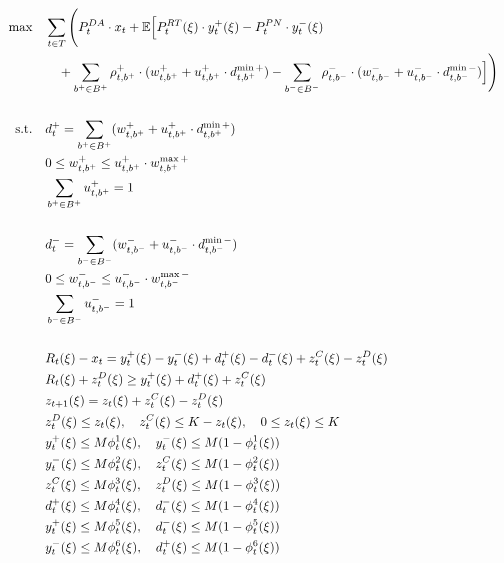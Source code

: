 \documentclass[10pt]{article}
\begin{document}
\begin{subequations}
    \begin{align}
        \text{max} \quad & \sum_{t\in T} \Bigg( P_t^{DA} \cdot x_t 
        + \mathbb{E} \Big[ P_t^{RT}(\xi) \cdot y_t^+(\xi) - P_t^{PN} \cdot y_t^-(\xi) & \notag \\
        &\quad + \sum_{b^+ \in B^+} \rho^+_{t,b^+} \cdot (w^+_{t,b^+} + u^+_{t,b^+} \cdot d^{\min+}_{t,b^+}) 
        - \sum_{b^- \in B^-} \rho^-_{t,b^-} \cdot (w^-_{t,b^-} + u^-_{t,b^-} \cdot d^{\min-}_{t,b^-}) \Big] \Bigg) & \\
        &&\notag\\
        \text{s.t.} \quad & d^{+}_{t} = \sum_{b^+ \in B^+} (w^+_{t,b^+} + u^+_{t,b^+} \cdot d^{\min+}_{t,b^+})& \\
        & 0 \leq w^+_{t,b^+} \leq u^+_{t,b^+} \cdot w^{\max+}_{t,b^+}&\\
        & \sum_{b^+ \in B^+} u^+_{t,b^+} = 1 &\\
        &&\notag\\
        & d^{-}_{t} = \sum_{b^- \in B^-} (w^-_{t,b^-} + u^-_{t,b^-} \cdot d^{\min-}_{t,b^-})&\\
        & 0 \leq w^-_{t,b^-} \leq u^-_{t,b^-} \cdot w^{\max-}_{t,b^-}&\\
        & \sum_{b^- \in B^-} u^-_{t,b^-} = 1 &\\
        &&\notag\\
        & R_{t}(\xi) - x_{t} = y_{t}^{+}(\xi) - y_{t}^{-}(\xi) + d^+_{t}(\xi) -  d^-_{t}(\xi) + z^C_{t}(\xi) - z^D_{t}(\xi) & \\
        & R_{t}(\xi) + z^D_{t}(\xi) \geq y^+_t(\xi) + d^+_{t}(\xi) + z^C_{t}(\xi) & \\
        & z_{t+1}(\xi) = z_{t}(\xi) + z^C_{t}(\xi) - z^D_{t}(\xi) & \\
        & z^D_{t}(\xi) \le z_{t}(\xi), \quad z^C_{t}(\xi) \le K - z_{t}(\xi), \quad 0 \leq z_{t}(\xi) \leq K & \\
        & y^+_{t}(\xi) \leq M \phi^1_{t}(\xi), \quad y^-_{t}(\xi) \leq M (1 - \phi^1_{t}(\xi)) & \\
        & y^-_{t}(\xi) \leq M \phi^2_{t}(\xi), \quad z^C_{t}(\xi) \leq M (1 - \phi^2_{t}(\xi)) & \\
        & z^C_{t}(\xi) \leq M \phi^3_{t}(\xi), \quad z^D_{t}(\xi) \leq M (1 - \phi^3_{t}(\xi)) & \\
        & d^+_{t}(\xi) \leq M \phi^4_{t}(\xi), \quad d^-_{t}(\xi) \leq M (1 - \phi^4_{t}(\xi)) & \\
        & y^+_{t}(\xi) \leq M \phi^5_{t}(\xi), \quad d^-_{t}(\xi) \leq M (1 - \phi^5_{t}(\xi)) & \\
        & y^-_{t}(\xi) \leq M \phi^6_{t}(\xi), \quad d^+_{t}(\xi) \leq M (1 - \phi^6_{t}(\xi)) & 
    \end{align}
\end{subequations}
\end{document}
